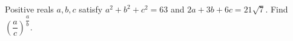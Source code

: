 Positive reals $a,b,c$ satisfy $a^2+b^2+c^2=63$ and $2a+3b+6c=21\sqrt7$. Find $(\dfrac{a}{c})^{\dfrac{a}{b}}$.
